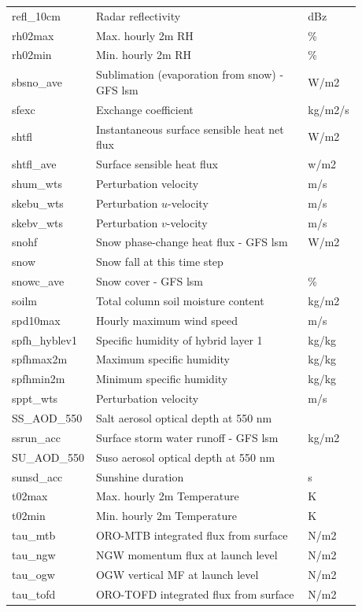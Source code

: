 \documentclass[11pt,fleqn]{report}              %
\begin{document}
\begin{enumerate}
\begin{enumerate}
{\begin{longtable}{p{0.17\linewidth} | p{0.6\linewidth} | p{0.11\linewidth} }
refl\_10cm &  Radar reflectivity & dBz \\
rh02max  & Max. hourly 2m RH & \% \\
rh02min  & Min. hourly 2m RH & \%  \\
sbsno\_ave  & Sublimation (evaporation from snow) - GFS lsm & W/m2  \\
sfexc  & Exchange coefficient & kg/m2/s \\
shtfl  & Instantaneous surface sensible heat net flux & W/m2  \\
shtfl\_ave & Surface sensible heat flux & w/m2  \\
shum\_wts  & Perturbation velocity & m/s  \\
skebu\_wts  & Perturbation $u$-velocity & m/s  \\
skebv\_wts  & Perturbation $v$-velocity & m/s  \\ 
snohf  & Snow phase-change heat flux - GFS lsm & W/m2  \\
snow & Snow fall at this time step & \\
snowc\_ave  & Snow cover - GFS lsm & \% \\
soilm  & Total column soil moisture content & kg/m2  \\ 
spd10max  & Hourly maximum wind speed & m/s \\
spfh\_hyblev1 & Specific humidity of hybrid layer 1 & kg/kg  \\
spfhmax2m  & Maximum specific humidity & kg/kg  \\
spfhmin2m  & Minimum specific humidity & kg/kg  \\
sppt\_wts &  Perturbation velocity & m/s \\
SS\_AOD\_550  & Salt aerosol optical depth at 550 nm & \\
ssrun\_acc  & Surface storm water runoff - GFS lsm & kg/m2  \\
SU\_AOD\_550  & Suso aerosol optical depth at 550 nm & \\
sunsd\_acc  & Sunshine duration & s  \\
t02max &  Max. hourly 2m Temperature & K  \\
t02min &  Min. hourly 2m Temperature & K \\
tau\_mtb & ORO-MTB integrated flux from surface & N/m2 \\
tau\_ngw & NGW momentum flux at launch level & N/m2 \\
tau\_ogw & OGW vertical MF at launch level & N/m2 \\
tau\_tofd & ORO-TOFD integrated flux from surface & N/m2 \\

\end{longtable}}
\end{enumerate}
\end{enumerate}
\end{document}
